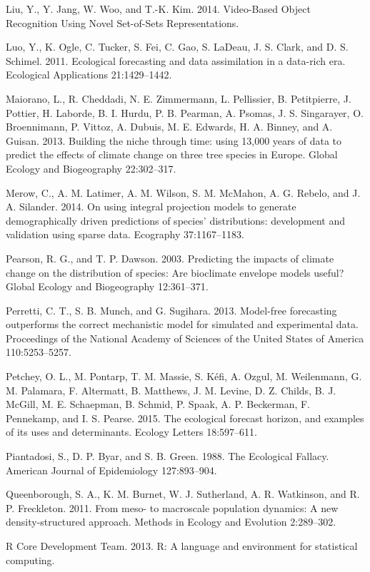\documentclass[12pt,]{article}
\begin{document}
Liu, Y., Y. Jang, W. Woo, and T.-K. Kim. 2014. Video-Based Object
Recognition Using Novel Set-of-Sets Representations.

Luo, Y., K. Ogle, C. Tucker, S. Fei, C. Gao, S. LaDeau, J. S. Clark, and
D. S. Schimel. 2011. Ecological forecasting and data assimilation in a
data-rich era. Ecological Applications 21:1429--1442.

Maiorano, L., R. Cheddadi, N. E. Zimmermann, L. Pellissier, B.
Petitpierre, J. Pottier, H. Laborde, B. I. Hurdu, P. B. Pearman, A.
Psomas, J. S. Singarayer, O. Broennimann, P. Vittoz, A. Dubuis, M. E.
Edwards, H. A. Binney, and A. Guisan. 2013. Building the niche through
time: using 13,000 years of data to predict the effects of climate
change on three tree species in Europe. Global Ecology and Biogeography
22:302--317.

Merow, C., A. M. Latimer, A. M. Wilson, S. M. McMahon, A. G. Rebelo, and
J. A. Silander. 2014. On using integral projection models to generate
demographically driven predictions of species' distributions:
development and validation using sparse data. Ecography 37:1167--1183.

Pearson, R. G., and T. P. Dawson. 2003. Predicting the impacts of
climate change on the distribution of species: Are bioclimate envelope
models useful? Global Ecology and Biogeography 12:361--371.

Perretti, C. T., S. B. Munch, and G. Sugihara. 2013. Model-free
forecasting outperforms the correct mechanistic model for simulated and
experimental data. Proceedings of the National Academy of Sciences of
the United States of America 110:5253--5257.

Petchey, O. L., M. Pontarp, T. M. Massie, S. K{é}fi, A. Ozgul, M.
Weilenmann, G. M. Palamara, F. Altermatt, B. Matthews, J. M. Levine, D.
Z. Childs, B. J. McGill, M. E. Schaepman, B. Schmid, P. Spaak, A. P.
Beckerman, F. Pennekamp, and I. S. Pearse. 2015. The ecological forecast
horizon, and examples of its uses and determinants. Ecology Letters
18:597--611.

Piantadosi, S., D. P. Byar, and S. B. Green. 1988. The Ecological
Fallacy. American Journal of Epidemiology 127:893--904.

Queenborough, S. A., K. M. Burnet, W. J. Sutherland, A. R. Watkinson,
and R. P. Freckleton. 2011. From meso- to macroscale population
dynamics: A new density-structured approach. Methods in Ecology and
Evolution 2:289--302.

R Core Development Team. 2013. R: A language and environment for
statistical computing.
\end{document}
